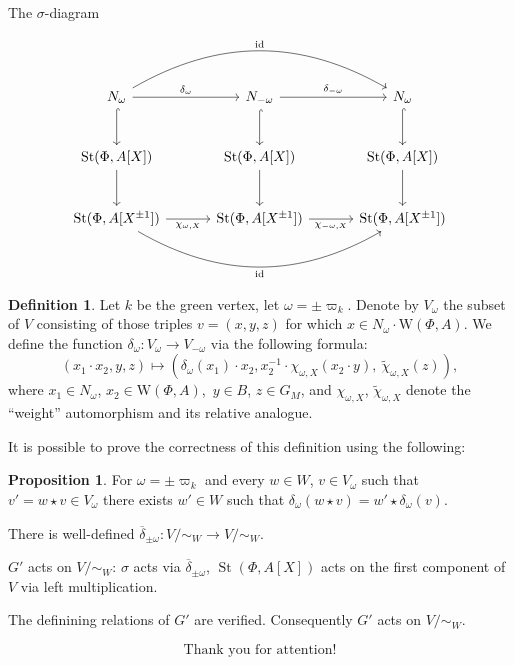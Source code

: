 \documentclass[handout]{beamer} %
\DeclareMathOperator{\St}{St}
\theoremstyle{definition}
\newtheorem*{prop}{Proposition}
\newtheorem*{dfn}{Definition}
\begin{document}
\begin{frame} [fragile]{The $\sigma$-diagram}

\[
\begin{tikzcd}[ampersand replacement=\&, column sep=3.2em, row sep=2.6em]
N_\omega
  \arrow[r, "\delta_\omega"]
  \arrow[d, hook]
  \arrow[rr, bend left=30, "\mathrm{id}"]
\&
N_{-\omega}
  \arrow[r, "\delta_{-\omega}"]
  \arrow[d, hook]
\&
N_\omega
  \arrow[d, hook]
\\
\St(\Phi,A[X])
  \arrow[d]
\&
\St(\Phi,A[X])
  \arrow[d]
\&
\St(\Phi,A[X])
  \arrow[d]
\\
\St(\Phi,A[X^{\pm1}])
  \arrow[r, "\chi_{\omega,X}"']
  \arrow[rr, bend right=30, "\mathrm{id}"']
\&
\St(\Phi,A[X^{\pm1}])
  \arrow[r, "\chi_{-\omega,X}"']
\&
\St(\Phi,A[X^{\pm1}])
\end{tikzcd}
\]
\end{frame}

\begin{frame}
 \begin{dfn} \label{sigma-def}
Let $k$ be the green vertex, let $\omega = \pm \varpi_k$.
Denote by $V_\omega$ the subset of $V$ consisting of those triples $v = (x, y, z)$ for which $x \in N_\omega\cdot \mathrm{W}(\Phi, A)$.
We define the function $\delta_\omega \colon V_\omega \to V_{-\omega}$ via the following formula:
\begin{equation} \label{eq:sigma-def} (x_1 \cdot x_2, y, z) \mapsto (\delta_\omega(x_1)\cdot x_2, x_2^{-1} \cdot \chi_{\omega, X}(x_2 \cdot y),\  \widetilde{\chi}_{\omega, X}(z)), \end{equation}
where $x_1 \in N_\omega$, $x_2 \in \mathrm{W}(\Phi, A)$,\ $y \in B$, $z \in G_M$, and
$\chi_{\omega, X}$, $\widetilde{\chi}_{\omega, X}$ denote the ``weight'' automorphism and its relative analogue.
\end{dfn}
\end{frame}

\begin{frame}
 It is possible to prove the correctness of this definition using the following:
\pause

 \begin{prop} \label{prop:v-correctness2}
For $\omega = \pm \varpi_k$ and every $w \in W$, $v \in V_\omega$ such that $v' = w \star v \in V_\omega$ there exists $w' \in W$ such that
$\delta_\omega(w \star v) = w' \star \delta_\omega(v)$.
\end{prop}
\pause

There is well-defined $\overline{\delta}_{\pm \omega} \colon V/\sim_W \to V/\sim_W$.
\pause

$G'$ acts on $V/\sim_W$: $\sigma$ acts via $\overline{\delta}_{\pm \omega}$, $\St(\Phi, A[X])$ acts on the first component of $V$ via left multiplication.
\pause

The definining relations of $G'$ are verified. Consequently $G'$ acts on $V/\sim_W$.

\end{frame}


\begin{frame}
\[ \text{Thank you for attention!} \]
\end{frame}
\end{document}
